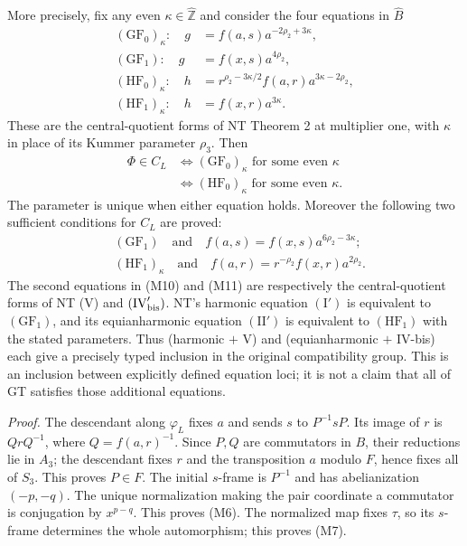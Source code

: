 More precisely, fix any even $\kappa\in\widehat{\mathbb Z}$ and consider
the four equations in $\widehat B$
\[
\begin{aligned}
 (\mathrm{GF}_0)_\kappa:\quad
       g&=f(a,s)a^{-2\rho_2+3\kappa},\\
 (\mathrm{GF}_1):\quad
       g&=f(x,s)a^{4\rho_2},\\
 (\mathrm{HF}_0)_\kappa:\quad
       h&=r^{\rho_2-3\kappa/2}f(a,r)a^{3\kappa-2\rho_2},\\
 (\mathrm{HF}_1)_\kappa:\quad
       h&=f(x,r)a^{3\kappa}.
\end{aligned}                                                   \tag{M8}
\]
These are the central-quotient forms of NT Theorem 2 at multiplier
one, with $\kappa$ in place of its Kummer parameter $\rho_3$.
Then
\[
 \begin{split}
 \Phi\in C_L
 &\Longleftrightarrow
   (\mathrm{GF}_0)_\kappa\text{ for some even }\kappa\\
 &\Longleftrightarrow
   (\mathrm{HF}_0)_\kappa\text{ for some even }\kappa.
 \end{split}                                                    \tag{M9}
\]
The parameter is unique when either equation holds. Moreover the
following two sufficient conditions for $C_L$ are proved:
\begin{align}
 &(\mathrm{GF}_1)\quad\text{and}\quad
 f(a,s)=f(x,s)a^{6\rho_2-3\kappa};                              \tag{M10}\\
 &(\mathrm{HF}_1)_\kappa\quad\text{and}\quad
 f(a,r)=r^{-\rho_2}f(x,r)a^{2\rho_2}.                           \tag{M11}
\end{align}
The second equations in (M10) and (M11) are respectively the
central-quotient forms of NT (V) and $(\mathrm{IV}'_{\rm bis})$.
NT's harmonic equation $(\mathrm I')$ is equivalent to
$(\mathrm{GF}_1)$, and its equianharmonic equation $(\mathrm{II}')$
is equivalent to $(\mathrm{HF}_1)$ with the stated parameters.
Thus (harmonic $+$ V) and (equianharmonic $+$ IV-bis) each give a
precisely typed inclusion in the original compatibility group.
This is an inclusion between explicitly defined equation loci;
it is not a claim that all of GT satisfies those additional equations.

\emph{Proof.} The descendant along $\varphi_L$ fixes $a$ and sends
$s$ to $P^{-1}sP$. Its image of $r$ is $QrQ^{-1}$, where
$Q=f(a,r)^{-1}$. Since $P,Q$ are commutators in $B$, their reductions
lie in $A_3$; the descendant fixes $r$ and the transposition $a$
modulo $F$, hence fixes all of $S_3$. This proves $P\in F$.
The initial $s$-frame is $P^{-1}$ and has abelianization $(-p,-q)$.
The unique normalization making the pair coordinate a commutator
is conjugation by $x^{p-q}$. This proves (M6). The normalized map
fixes $\tau$, so its $s$-frame determines the whole automorphism;
this proves (M7).

